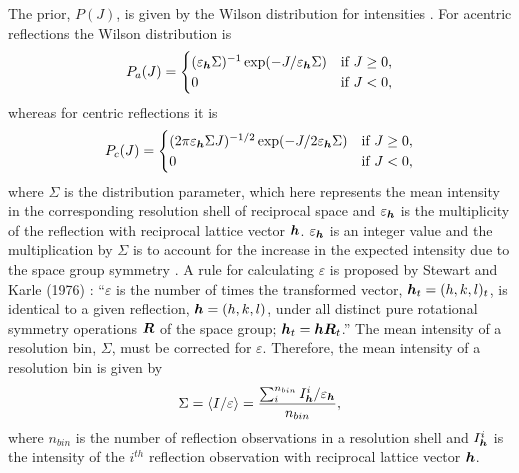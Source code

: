 The prior, $P(J)$, is given by the Wilson distribution for intensities \cite{wilson1949probability}.
For acentric reflections the Wilson distribution is
\begin{equation}
    P_a(J) =
    \begin{cases}
        (\varepsilon_{\boldsymbol{h}}\Sigma)^{-1} \exp(-J/\varepsilon_{\boldsymbol{h}}\Sigma) & \mbox{if } J \ge 0, \\
        0                           & \mbox{if } J < 0,
    \end{cases}
    \label{eq:Wilson Distribution for acentric reflections - Intensities}
\end{equation}
whereas for centric reflections it is
\begin{equation}
    P_c(J) =
    \begin{cases}
        (2\pi\varepsilon_{\boldsymbol{h}}\Sigma J)^{-1/2} \exp(-J/2\varepsilon_{\boldsymbol{h}}\Sigma) & \mbox{if } J \ge 0, \\
        0                                      & \mbox{if } J < 0,
    \end{cases}
    \label{eq:Wilson Distribution for centric reflections - Intensities}
\end{equation}
where $\Sigma$ is the distribution parameter, which here represents the mean intensity in the corresponding resolution shell of reciprocal space and $\varepsilon_{\boldsymbol{h}}$ is the multiplicity of the reflection with reciprocal lattice vector $\boldsymbol{h}$. $\varepsilon_{\boldsymbol{h}}$ is an integer value and the multiplication by $\Sigma$ is to account for the increase in the expected intensity due to the space group symmetry \cite{blessing1998intensity}. A rule for calculating $\varepsilon$ is proposed by Stewart and Karle (1976) \cite{stewart1976}: ``$\varepsilon$ is the number of times the transformed vector, $\boldsymbol{h}_t = (h,k,l)_t$, is identical to a given reflection, $\boldsymbol{h} = (h,k,l)$, under all distinct pure rotational symmetry operations $\boldsymbol{R}$ of the space group; $\boldsymbol{h}_t = \boldsymbol{h}\boldsymbol{R}_t$.''
The mean intensity of a resolution bin, $\Sigma$, must be corrected for $\varepsilon$.
Therefore, the mean intensity of a resolution bin is given by
\begin{equation}
    \Sigma = \langle I/\varepsilon \rangle = \frac{\sum^{n_{bin}}_i I^i_{\boldsymbol{h}}/\varepsilon_{\boldsymbol{h}}}{n_{bin}},
    \label{eq:Mean intensity of resolution bin}
\end{equation}
where $n_{bin}$ is the number of reflection observations in a resolution shell and $I^i_{\boldsymbol{h}}$ is the intensity of the $i^{th}$ reflection observation with reciprocal lattice vector $\boldsymbol{h}$.

